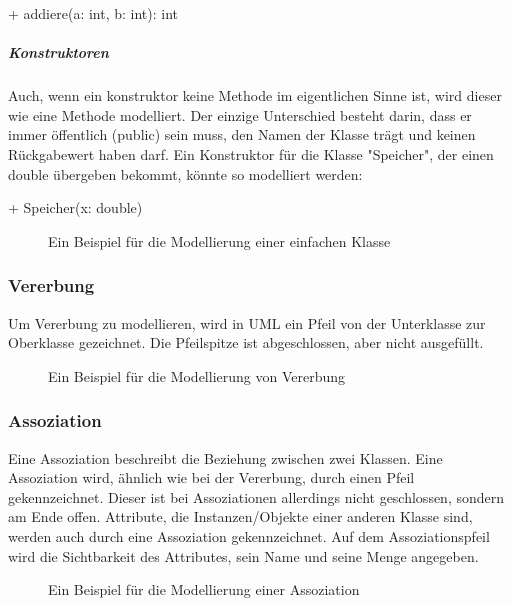 \documentclass{article}
\begin{document}
	\begin{center}
		+ addiere(a: int, b: int): int
	\end{center}

	\subparagraph{Konstruktoren}
	Auch, wenn ein konstruktor keine Methode im eigentlichen Sinne ist, wird dieser wie eine Methode modelliert. Der einzige Unterschied besteht darin, dass er immer öffentlich (public) sein muss, den Namen der Klasse trägt und keinen Rückgabewert haben darf. Ein Konstruktor für die Klasse "Speicher", der einen double übergeben bekommt, könnte so modelliert werden:

	\begin{center}
		+ Speicher(x: double)
	\end{center}

	\begin{figure}[h!]
		\centering
		
		\caption{Ein Beispiel für die Modellierung einer einfachen Klasse}
	\end{figure}

	\subsubsection{Vererbung}
	Um Vererbung zu modellieren, wird in UML ein Pfeil von der Unterklasse zur Oberklasse gezeichnet. Die Pfeilspitze ist abgeschlossen, aber nicht ausgefüllt.

	\begin{figure}[h!]
		\centering
		
		\caption{Ein Beispiel für die Modellierung von Vererbung}
	\end{figure}

	\subsubsection{Assoziation}
	Eine Assoziation beschreibt die Beziehung zwischen zwei Klassen. Eine Assoziation wird, ähnlich wie bei der Vererbung, durch einen Pfeil gekennzeichnet. Dieser ist bei Assoziationen allerdings nicht geschlossen, sondern am Ende offen. Attribute, die Instanzen/Objekte einer anderen Klasse sind, werden auch durch eine Assoziation gekennzeichnet. Auf dem Assoziationspfeil wird die Sichtbarkeit des Attributes, sein Name und seine Menge angegeben.

	\begin{figure}[h!]
		\centering
		
		\caption{Ein Beispiel für die Modellierung einer Assoziation}
	\end{figure}
\end{document}
